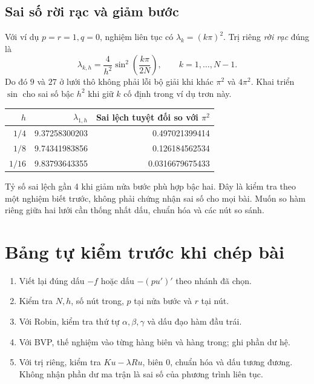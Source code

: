 \subsection{Sai số rời rạc và giảm bước}
Với ví dụ $p=r=1,q=0$, nghiệm liên tục có $\lambda_k=(k\pi)^2$. Trị riêng \emph{rời rạc} đúng là
\[
 \lambda_{k,h}=\frac4{h^2}\sin^2\!\left(\frac{k\pi}{2N}\right),
 \qquad k=1,\ldots,N-1.
\]
Do đó $9$ và $27$ ở lưới thô không phải lỗi bộ giải khi khác $\pi^2$ và $4\pi^2$. Khai triển $\sin$ cho sai số bậc $h^2$ khi giữ $k$ cố định trong ví dụ trơn này.
\begin{center}\begin{tabular}{rrr}\toprule
$h$&$\lambda_{1,h}$&Sai lệch tuyệt đối so với $\pi^2$\\\midrule
$1/4$&9.37258300203&0.497021399414\\
$1/8$&9.74341983856&0.126184562534\\
$1/16$&9.83793643355&0.0316679675433\\\bottomrule
\end{tabular}\end{center}
Tỷ số sai lệch gần 4 khi giảm nửa bước phù hợp bậc hai. Đây là kiểm tra theo một nghiệm biết trước, không phải chứng nhận sai số cho mọi bài. Muốn so hàm riêng giữa hai lưới cần thống nhất dấu, chuẩn hóa và các nút so sánh.

\section{Bảng tự kiểm trước khi chép bài}
\begin{enumerate}
\item Viết lại đúng dấu $-f$ hoặc dấu $-(pu')'$ theo nhánh đã chọn.
\item Kiểm tra $N,h$, số nút trong, $p$ tại nửa bước và $r$ tại nút.
\item Với Robin, kiểm tra thứ tự $\alpha,\beta,\gamma$ và dấu đạo hàm đầu trái.
\item Với BVP, thế nghiệm vào từng hàng biên và hàng trong; ghi phần dư hệ.
\item Với trị riêng, kiểm tra $Ku-\lambda Ru$, biên 0, chuẩn hóa và dấu tương đương. Không nhận phần dư ma trận là sai số của phương trình liên tục.
\end{enumerate}
